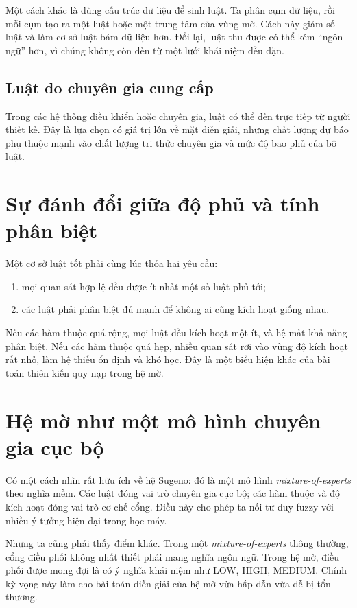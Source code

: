 Một cách khác là dùng cấu trúc dữ liệu để sinh luật. Ta phân cụm dữ liệu, rồi mỗi cụm tạo ra một luật hoặc một trung tâm của vùng mờ. Cách này giảm số luật và làm cơ sở luật bám dữ liệu hơn. Đổi lại, luật thu được có thể kém ``ngôn ngữ'' hơn, vì chúng không còn đến từ một lưới khái niệm đều đặn.

\subsection{Luật do chuyên gia cung cấp}

Trong các hệ thống điều khiển hoặc chuyên gia, luật có thể đến trực tiếp từ người thiết kế. Đây là lựa chọn có giá trị lớn về mặt diễn giải, nhưng chất lượng dự báo phụ thuộc mạnh vào chất lượng tri thức chuyên gia và mức độ bao phủ của bộ luật.

\section{Sự đánh đổi giữa độ phủ và tính phân biệt}

Một cơ sở luật tốt phải cùng lúc thỏa hai yêu cầu:

\begin{enumerate}
\item mọi quan sát hợp lệ đều được ít nhất một số luật phủ tới;
\item các luật phải phân biệt đủ mạnh để không ai cũng kích hoạt giống nhau.
\end{enumerate}

Nếu các hàm thuộc quá rộng, mọi luật đều kích hoạt một ít, và hệ mất khả năng phân biệt. Nếu các hàm thuộc quá hẹp, nhiều quan sát rơi vào vùng độ kích hoạt rất nhỏ, làm hệ thiếu ổn định và khó học. Đây là một biểu hiện khác của bài toán thiên kiến quy nạp trong hệ mờ.

\section{Hệ mờ như một mô hình chuyên gia cục bộ}

Có một cách nhìn rất hữu ích về hệ Sugeno: đó là một mô hình \emph{mixture-of-experts} theo nghĩa mềm. Các luật đóng vai trò chuyên gia cục bộ; các hàm thuộc và độ kích hoạt đóng vai trò cơ chế cổng. Điều này cho phép ta nối tư duy fuzzy với nhiều ý tưởng hiện đại trong học máy.

Nhưng ta cũng phải thấy điểm khác. Trong một \emph{mixture-of-experts} thông thường, cổng điều phối không nhất thiết phải mang nghĩa ngôn ngữ. Trong hệ mờ, điều phối được mong đợi là có ý nghĩa khái niệm như LOW, HIGH, MEDIUM. Chính kỳ vọng này làm cho bài toán diễn giải của hệ mờ vừa hấp dẫn vừa dễ bị tổn thương.

